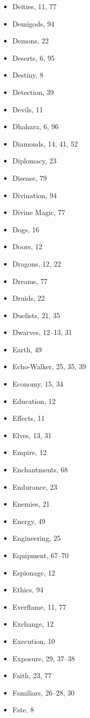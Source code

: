 \begin{multicols}{2}
\begin{itemize}
  \item Deities, 11, 77
  \item Demigods, 94
  \item Demons, 22
  \item Deserts, 6, 95
  \item Destiny, 8
  \item Detection, 39
  \item Devils, 11
  \item Dhahara, 6, 96
  \item Diamonds, 14, 41, 52
  \item Diplomacy, 23
  \item Disease, 79
  \item Divination, 94
  \item Divine Magic, 77
  \item Dogs, 16
  \item Doors, 12
  \item Dragons, 12, 22
  \item Dreams, 77
  \item Druids, 22
  \item Duelists, 21, 35
  \item Dwarves, 12--13, 31
  \item Earth, 49
  \item Echo-Walker, 25, 35, 39
  \item Economy, 15, 34
  \item Education, 12
  \item Effects, 11
  \item Elves, 13, 31
  \item Empire, 12
  \item Enchantments, 68
  \item Endurance, 23
  \item Enemies, 21
  \item Energy, 49
  \item Engineering, 25
  \item Equipment, 67--70
  \item Espionage, 12
  \item Ethics, 94
  \item Everflame, 11, 77
  \item Exchange, 12
  \item Execution, 10
  \item Exposure, 29, 37--38
  \item Faith, 23, 77
  \item Familiars, 26--28, 30
  \item Fate, 8

\end{itemize}
\end{multicols}
